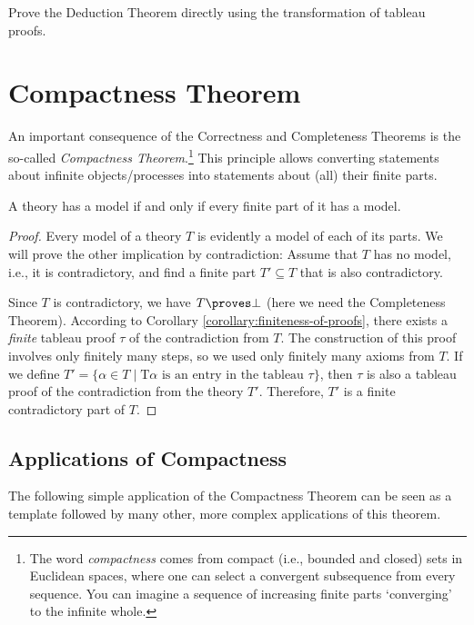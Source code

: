 \begin{exercise}
Prove the Deduction Theorem directly using the transformation of tableau proofs.
\end{exercise}

\section{Compactness Theorem}

An important consequence of the Correctness and Completeness Theorems is the so-called \emph{Compactness Theorem}.\footnote{The word \emph{compactness} comes from compact (i.e., bounded and closed) sets in Euclidean spaces, where one can select a convergent subsequence from every sequence. You can imagine a sequence of increasing finite parts `converging' to the infinite whole.} This principle allows converting statements about infinite objects/processes into statements about (all) their finite parts.

\begin{theorem}\label{theorem:compactness-theorem}
A theory has a model if and only if every finite part of it has a model.    
\end{theorem}

\begin{proof}
Every model of a theory $T$ is evidently a model of each of its parts. We will prove the other implication by contradiction: Assume that $T$ has no model, i.e., it is contradictory, and find a finite part $T' \subseteq T$ that is also contradictory.

Since $T$ is contradictory, we have $T \proves \bot$ (here we need the Completeness Theorem). According to Corollary \ref{corollary:finiteness-of-proofs}, there exists a \emph{finite} tableau proof $\tau$ of the contradiction from $T$. The construction of this proof involves only finitely many steps, so we used only finitely many axioms from $T$. If we define $T' = \{\alpha \in T \mid \mathrm{T}\alpha \text{ is an entry in the tableau $\tau$}\}$, then $\tau$ is also a tableau proof of the contradiction from the theory $T'$. Therefore, $T'$ is a finite contradictory part of $T$.
\end{proof}

\subsection{Applications of Compactness}

The following simple application of the Compactness Theorem can be seen as a template followed by many other, more complex applications of this theorem. 

